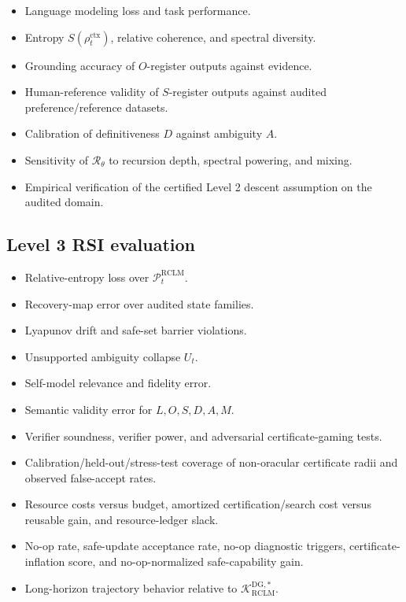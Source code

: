 \documentclass[11pt,a4paper]{article}
\newcommand{\Pcal}{\mathcal P}
\newcommand{\Kcal}{\mathcal K}
\newcommand{\Rcal}{\mathcal R}
\newcommand{\RCLM}{\mathrm{RCLM}}
\newcommand{\DG}{\mathrm{DG}}
\newcommand{\ctx}{\mathrm{ctx}}
\begin{document}
\begin{itemize}[leftmargin=1.5em]
    \item Language modeling loss and task performance.
    \item Entropy \(S(\rho_t^{\ctx})\), relative coherence, and spectral diversity.
    \item Grounding accuracy of \(O\)-register outputs against evidence.
    \item Human-reference validity of \(S\)-register outputs against audited preference/reference datasets.
    \item Calibration of definitiveness \(D\) against ambiguity \(A\).
    \item Sensitivity of \(\Rcal_{\theta}\) to recursion depth, spectral powering, and mixing.
    \item Empirical verification of the certified Level 2 descent assumption on the audited domain.
\end{itemize}

\subsection{Level 3 RSI evaluation}

\begin{itemize}[leftmargin=1.5em]
    \item Relative-entropy loss over \(\Pcal_t^{\RCLM}\).
    \item Recovery-map error over audited state families.
    \item Lyapunov drift and safe-set barrier violations.
    \item Unsupported ambiguity collapse \(U_t\).
    \item Self-model relevance and fidelity error.
    \item Semantic validity error for \(L,O,S,D,A,M\).
    \item Verifier soundness, verifier power, and adversarial certificate-gaming tests.
    \item Calibration/held-out/stress-test coverage of non-oracular certificate radii and observed false-accept rates.
    \item Resource costs versus budget, amortized certification/search cost versus reusable gain, and resource-ledger slack.
    \item No-op rate, safe-update acceptance rate, no-op diagnostic triggers, certificate-inflation score, and no-op-normalized safe-capability gain.
    \item Long-horizon trajectory behavior relative to \(\Kcal_{\RCLM}^{\DG,*}\).
\end{itemize}
\end{document}
